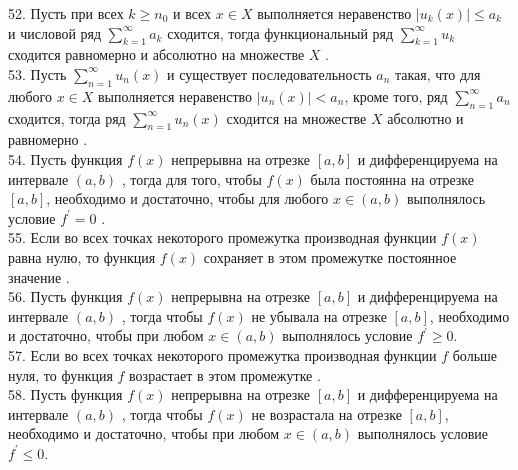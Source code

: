 \documentclass[12pt]{article}
\begin{document}
52. Пусть при всех ${k \geq n_0}$ и всех ${x \in X}$ выполняется неравенство ${|u_k(x)| \leq a_k}$ и числовой ряд ${\sum _{k=1}^{\infty} a_k}$ сходится, тогда функциональный ряд ${\sum _{k=1}^{\infty} u_k}$ сходится равномерно и абсолютно на множестве ${\displaystyle X}$ .\\

53. Пусть ${\sum _{{n=1}}^{{\infty }} u_{n}(x)}$ и существует последовательность ${\displaystyle a_{n}}$ такая, что для любого ${\displaystyle x\in X}$  выполняется неравенство ${\displaystyle |u_{n}(x)|<a_{n}}$, кроме того, ряд ${\displaystyle \sum _{n=1}^{\infty } a_{n}}$ сходится, тогда ряд ${\displaystyle \sum _{n=1}^{\infty } u_{n}(x)}$ сходится на множестве ${\displaystyle X}$ абсолютно и равномерно .\\

54. Пусть функция ${\displaystyle f(x)}$ непрерывна на отрезке  ${\displaystyle [a,b]}$ и дифференцируема на интервале ${\displaystyle (a,b)}$ , тогда для того, чтобы ${\displaystyle f(x)}$ была постоянна на отрезке ${\displaystyle [a,b]}$, необходимо и достаточно, чтобы для любого ${\displaystyle x \in (a,b)}$ выполнялось условие ${\displaystyle f^{\prime}=0}$ .\\

55. Если во всех точках некоторого промежутка производная функции ${\displaystyle f(x)}$ равна нулю, то функция ${\displaystyle f(x)}$ сохраняет в этом промежутке постоянное значение .\\

56. Пусть функция ${\displaystyle f(x)}$ непрерывна на отрезке  ${\displaystyle [a,b]}$ и дифференцируема на интервале ${\displaystyle (a,b)}$ ,  тогда чтобы ${\displaystyle f(x)}$ не убывала на отрезке ${\displaystyle [a,b]}$, необходимо и достаточно, чтобы при любом ${\displaystyle x \in (a,b)}$ выполнялось условие ${\displaystyle f^{\prime} \geq 0}$.\\

57. Если во всех точках некоторого промежутка производная функции ${\displaystyle f}$ больше нуля, то функция ${\displaystyle f}$ возрастает в этом промежутке .\\

58. Пусть функция ${\displaystyle f(x)}$ непрерывна на отрезке  ${\displaystyle [a,b]}$ и дифференцируема на интервале ${\displaystyle (a,b)}$ ,  тогда чтобы ${\displaystyle f(x)}$ не возрастала на отрезке ${\displaystyle [a,b]}$, необходимо и достаточно, чтобы при любом ${\displaystyle x \in (a,b)}$ выполнялось условие ${\displaystyle f^{\prime} \leq 0}$.\\
\end{document}
